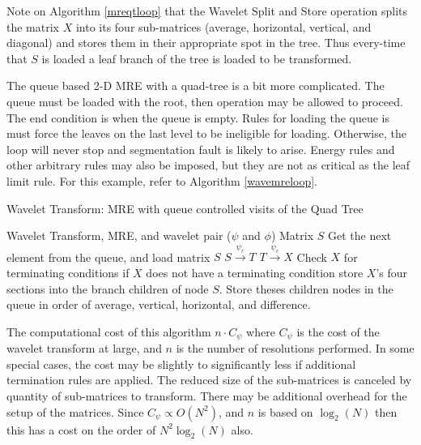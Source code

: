 Note on Algorithm \ref{mreqtloop} that the Wavelet Split and Store operation splits the matrix $X$ into its four sub-matrices (average, horizontal, vertical, and diagonal) and stores them in their appropriate spot in the tree.  Thus every-time that $S$ is loaded a leaf branch of the tree is loaded to be transformed.  

The queue based 2-D MRE with a quad-tree is a bit more complicated.  The queue must be loaded with the root, then operation may be allowed to proceed.  The end condition is when the queue is empty.  Rules for loading the queue is must force the leaves on the last level to be ineligible for loading.    Otherwise, the loop will never stop and segmentation fault is likely to arise.  Energy rules and other arbitrary rules may also be imposed, but they are not as critical as the leaf limit rule.  For this example, refer to Algorithm \ref{wavemreloop}.
\begin{algorithm}
\caption {Wavelet Transform: MRE with queue controlled visits of the Quad Tree}
\label{wavemreloop}
\begin {algorithmic}
\REQUIRE Wavelet Transform, MRE, and wavelet pair ($\psi$ and $\phi$)
\REQUIRE Matrix $S$ 
\STATE Get the next element from the queue, and load matrix $S$
\STATE $S \stackrel{\psi_r}{\to} T$
\STATE $T \stackrel{\psi_c}{\to} X$
\STATE Check $X$ for terminating conditions
\STATE if $X$ does not have a terminating condition store $X$'s four sections into the branch children of node $S$.  Store theses children nodes in the queue in order of average, vertical, horizontal, and difference.

\ENDWHILE
\end {algorithmic}
\end{algorithm}
The computational cost of this algorithm $n\cdot C_\psi$  where $C_\psi$ is the cost of the wavelet transform at large, and $n$ is the number of resolutions performed.  In some special cases, the cost may be slightly to significantly less if additional termination rules are applied.  The reduced size of the sub-matrices is canceled by quantity of sub-matrices to transform.  There may be additional overhead for the setup of the matrices.  Since $C_\psi \propto O(N^2)$, and $n$ is based on $\log_2(N)$ then this has a cost on the order of $N^2\log_2(N)$ also.  

